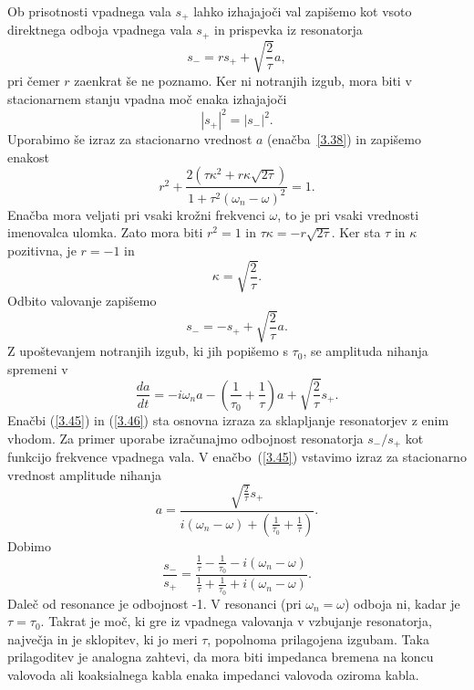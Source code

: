 Ob prisotnosti vpadnega vala $s_{+}$ lahko izhajajoči val zapišemo kot
vsoto direktnega odboja vpadnega vala $s_{+}$ in prispevka iz resonatorja
\begin{equation}
s_{-}=rs_{+}+\sqrt{\frac{2}{\tau}}a,
\label{3.41}
\end{equation}
pri čemer $r$ zaenkrat še ne poznamo. Ker ni notranjih izgub, mora biti v 
stacionarnem stanju vpadna moč enaka izhajajoči
\begin{equation}
|s_{+}|^{2}=|s_{-}|^{2}.
\label{3.42}
\end{equation}
Uporabimo še izraz za stacionarno vrednost $a$  (enačba~\ref{3.38}) in zapišemo
enakost 
\begin{equation}
r^{2}+\frac{2(\tau\kappa^{2}+r\kappa\sqrt{2\tau})}{1+\tau^{2}(\omega_{n}-\omega)^{2}}=1.
\label{3.43}
\end{equation}
Enačba mora veljati pri vsaki krožni  frekvenci $\omega$, to je pri vsaki vrednosti imenovalca
ulomka. Zato mora biti $r^{2}=1$ in $\tau\kappa=-r\sqrt{2\tau}$.
Ker sta $\tau$ in $\kappa$ pozitivna, je $r=-1$ in 
\begin{equation}
\kappa=\sqrt{\frac{2}{\tau}}.
\label{3.44}
\end{equation}
 Odbito valovanje zapišemo 
\begin{equation}
s_{-}=-s_{+}+\sqrt{\frac{2}{\tau}}a.
\label{3.45}
\end{equation}
Z upoštevanjem notranjih izgub, ki jih popišemo s $\tau_0$, se amplituda nihanja spremeni v 
\begin{equation}
\frac{da}{dt}=-i\omega_{n}a-\left(\frac{1}{\tau_{0}}+\frac{1}{\tau}\right)a+
\sqrt{\frac{2}{\tau}}s_{+}.
\label{3.46}
\end{equation}
 Enačbi (\ref{3.45}) in (\ref{3.46}) sta osnovna izraza za sklapljanje
resonatorjev z enim vhodom. Za primer uporabe izračunajmo odbojnost
resonatorja $s_{-}/s_{+}$ kot funkcijo frekvence vpadnega vala. V
enačbo~(\ref{3.45}) vstavimo izraz za stacionarno vrednost amplitude
nihanja 
\begin{equation}
a=\frac{\sqrt{\frac{2}{\tau}}s_{+}}{i(\omega_{n}-\omega)+(\frac{1}{\tau_{0}}+
\frac{1}{\tau})}.
\label{3.47}
\end{equation}
Dobimo
\begin{equation}
\frac{s_{-}}{s_{+}}=\frac{\frac{1}{\tau}-\frac{1}{\tau_0}-i(\omega_{n}-\omega)}
{\frac{1}{\tau}
+\frac{1}{\tau_0}+i(\omega_{n}-\omega)}.
\label{3.48}
\end{equation}
Daleč od resonance je odbojnost -1. V resonanci (pri $\omega_{n}=\omega$)
odboja ni, kadar je $\tau=\tau_{0}$. Takrat je moč, ki gre iz
vpadnega valovanja v vzbujanje resonatorja, največja in je sklopitev,
ki jo meri $\tau$, popolnoma prilagojena izgubam. Taka prilagoditev
je analogna zahtevi, da mora biti impedanca bremena na koncu valovoda
ali koaksialnega kabla enaka impedanci valovoda oziroma kabla.

